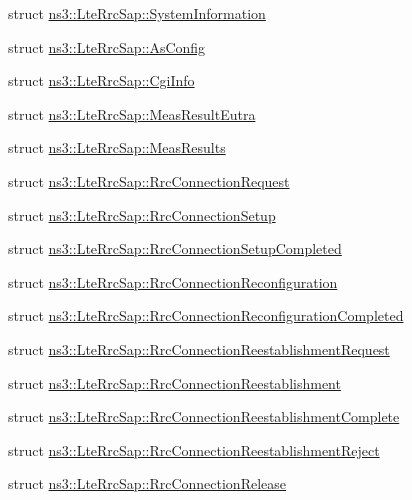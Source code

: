\begin{DoxyCompactItemize}
\item 
struct \hyperlink{structns3_1_1LteRrcSap_1_1SystemInformation}{ns3\+::\+Lte\+Rrc\+Sap\+::\+System\+Information}
\item 
struct \hyperlink{structns3_1_1LteRrcSap_1_1AsConfig}{ns3\+::\+Lte\+Rrc\+Sap\+::\+As\+Config}
\item 
struct \hyperlink{structns3_1_1LteRrcSap_1_1CgiInfo}{ns3\+::\+Lte\+Rrc\+Sap\+::\+Cgi\+Info}
\item 
struct \hyperlink{structns3_1_1LteRrcSap_1_1MeasResultEutra}{ns3\+::\+Lte\+Rrc\+Sap\+::\+Meas\+Result\+Eutra}
\item 
struct \hyperlink{structns3_1_1LteRrcSap_1_1MeasResults}{ns3\+::\+Lte\+Rrc\+Sap\+::\+Meas\+Results}
\item 
struct \hyperlink{structns3_1_1LteRrcSap_1_1RrcConnectionRequest}{ns3\+::\+Lte\+Rrc\+Sap\+::\+Rrc\+Connection\+Request}
\item 
struct \hyperlink{structns3_1_1LteRrcSap_1_1RrcConnectionSetup}{ns3\+::\+Lte\+Rrc\+Sap\+::\+Rrc\+Connection\+Setup}
\item 
struct \hyperlink{structns3_1_1LteRrcSap_1_1RrcConnectionSetupCompleted}{ns3\+::\+Lte\+Rrc\+Sap\+::\+Rrc\+Connection\+Setup\+Completed}
\item 
struct \hyperlink{structns3_1_1LteRrcSap_1_1RrcConnectionReconfiguration}{ns3\+::\+Lte\+Rrc\+Sap\+::\+Rrc\+Connection\+Reconfiguration}
\item 
struct \hyperlink{structns3_1_1LteRrcSap_1_1RrcConnectionReconfigurationCompleted}{ns3\+::\+Lte\+Rrc\+Sap\+::\+Rrc\+Connection\+Reconfiguration\+Completed}
\item 
struct \hyperlink{structns3_1_1LteRrcSap_1_1RrcConnectionReestablishmentRequest}{ns3\+::\+Lte\+Rrc\+Sap\+::\+Rrc\+Connection\+Reestablishment\+Request}
\item 
struct \hyperlink{structns3_1_1LteRrcSap_1_1RrcConnectionReestablishment}{ns3\+::\+Lte\+Rrc\+Sap\+::\+Rrc\+Connection\+Reestablishment}
\item 
struct \hyperlink{structns3_1_1LteRrcSap_1_1RrcConnectionReestablishmentComplete}{ns3\+::\+Lte\+Rrc\+Sap\+::\+Rrc\+Connection\+Reestablishment\+Complete}
\item 
struct \hyperlink{structns3_1_1LteRrcSap_1_1RrcConnectionReestablishmentReject}{ns3\+::\+Lte\+Rrc\+Sap\+::\+Rrc\+Connection\+Reestablishment\+Reject}
\item 
struct \hyperlink{structns3_1_1LteRrcSap_1_1RrcConnectionRelease}{ns3\+::\+Lte\+Rrc\+Sap\+::\+Rrc\+Connection\+Release}
\item 

\end{DoxyCompactItemize}
